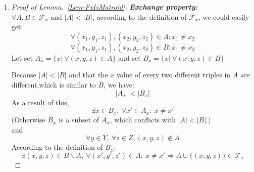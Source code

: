 \documentclass[12pt,a4paper]{article}
\makeatletter
\newtheorem*{solution}{Solution}
\theoremstyle{definition}
\renewenvironment{solution}[1][Solution] {\par\pushQED{\qed}\normalfont\topsep6\p@\@plus6\p@\relax\trivlist\item[\hskip\labelsep\bfseries#1\@addpunct{.}]\ignorespaces}{\popQED\endtrivlist\@endpefalse} \makeatother
\makeatother
\begin{document}
\begin{enumerate}
\begin{enumerate}
\begin{solution}
\begin{enumerate}
\begin{proof}[Proof of Lemma.~\ref{Lem-FxIsMatroid}]
			
			\textbf{\textit{Exchange property:}}\\
			$\forall A,B\in \mathcal{F}_x$ and $|A|<|B|$, according to the definition of $\mathcal{F}_x$, we could easily get:
			$$\forall (x_1,y_1,z_1),(x_2,y_2,z_2)\in A:x_1\neq x_2$$
			$$\forall (x_1,y_1,z_1),(x_2,y_2,z_2)\in B:x_1\neq x_2$$
			Let set $A_x=\{x|\ \forall(x,y,z)\in A\}$ and set $B_x=\{x|\ \forall(x,y,z)\in B\}$
			
			Because $|A|<|B|$ and that the $x$ value of every two different triples in $A$ are different,which is similar to $B$, we have: $$|A_x|<|B_x|$$
			As a result of this, $$\exists x \in B_x,\ \forall x' \in A_x:\ x\neq x'$$
			(Otherwise $B_x$ is a subset of $A_x$, which conflicts with $|A|<|B|$.)\\
			and
			$$\forall y\in Y,\ \forall z\in Z, (x,y,z)\notin A$$
			According to the definition of $B_x$:
			$$ \exists (x,y,z)\in B\backslash A,\ \forall (x',y',z')\in A:\ x\neq x' 
			\Rightarrow  A\cup \{(x,y,z)\}\in \mathcal{F}_x $$
			

\end{proof}
\end{enumerate}
\end{solution}
\end{enumerate}
\end{enumerate}
\end{document}
